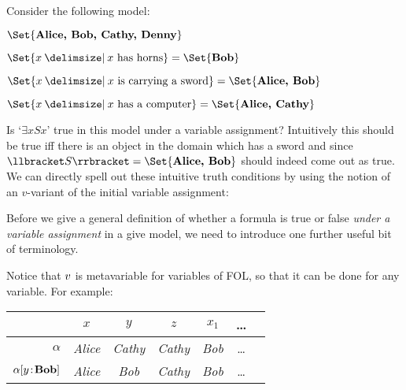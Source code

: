 Consider the following model:
\begin{center}

\begin{interp}\item[\domain] $\Set{\text{\emph{Alice, Bob, Cathy, Denny}}}$
\item[\denote{H}] $\Set{x\given x\text{ has horns}}=\Set{\text{\emph{Bob}}}$
\item[\denote{S}] $\Set{x\given x\text{ is carrying a sword}}=\Set{\text{\emph{Alice, Bob}}}$
\item[\denote{C}]$\Set{x\given x\text{ has a computer}}=\Set{\text{\emph{Alice, Cathy}}}$
\end{interp}
\end{center}

\noindent Is `$\exists x Sx$' true in this model under a variable assignment? Intuitively this should be true iff there is an object in the domain which has a sword and since $\denote{S}=\Set{\text{\emph{Alice, Bob}}}$ should indeed come out as true. We can directly spell out these intuitive truth conditions by using the notion of an  $v$-variant of the initial variable assignment:

Before we give a general definition of whether a formula is true or false \emph{under a variable assignment} in a give model, we need to introduce one further useful bit of terminology.

Notice that $v$ is metavariable for variables of FOL, so that it can be done for any variable. 
For example:
\begin{center}
	\begin{tabular}{r@{\,:\quad}cccccc}
		\omit & $x$ & $y$ & $z$ & $x_1$ & \ldots \\ \hline
		$\alpha$ & \emph{Alice} & \emph{Cathy} & \emph{Cathy} & \emph{Bob} & \ldots \\
		$\alpha[y \!:\! \textbf{Bob}]$ & \emph{Alice} & \emph{Bob} & \emph{Cathy} & \emph{Bob} & \ldots
	\end{tabular}
\end{center}

